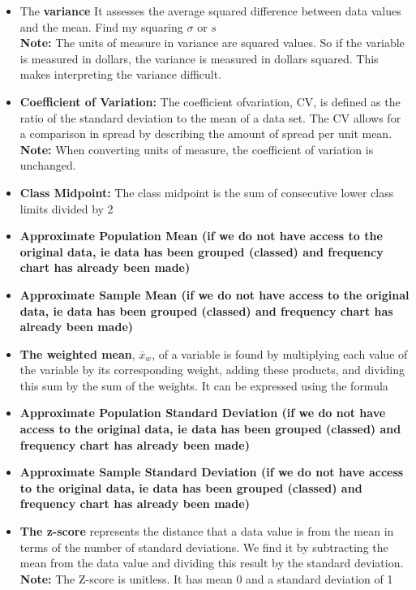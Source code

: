 \documentclass{report}
\begin{document}
\begin{itemize}
            \item The \textbf{variance}  It assesses the average squared difference between data values and the mean. Find my squaring $\sigma $ or $s$ \\
              \textbf{Note:} The units of measure in variance are squared values. So if the variable is measured in dollars, the variance is measured in dollars squared. This makes interpreting the variance difficult.
                \item \textbf{Coefficient of Variation:} The coefficient of​ variation, CV, is defined as the ratio of the standard deviation to the mean of a data set. The CV allows for a comparison in spread by describing the amount of spread per unit mean.
               \textbf{Note:} When converting units of​ measure, the coefficient of variation is unchanged.
             \item \textbf{Class Midpoint:} The class midpoint is the sum of consecutive lower class limits divided by 2
             \item \textbf{Approximate Population Mean (if we do not have access to the original data, ie data has been grouped (classed) and frequency chart has already been made)}
            \item \textbf{Approximate Sample Mean (if we do not have access to the original data, ie data has been grouped (classed) and frequency chart has already been made)}
            \item \textbf{The weighted mean}, $\overline{x}_{w}$, of a variable is found by multiplying each value of the variable by its corresponding weight, adding these products, and dividing this sum by the sum of the weights. It can be expressed using the formula
            \item \textbf{Approximate Population Standard Deviation (if we do not have access to the original data, ie data has been grouped (classed) and frequency chart has already been made)}
            \item \textbf{Approximate Sample Standard Deviation (if we do not have access to the original data, ie data has been grouped (classed) and frequency chart has already been made)}
             \item \textbf{The z-score} represents the distance that a data value is from the mean in terms of the number of standard deviations. We find it by subtracting the mean from the data value and dividing this result by the standard deviation.
                 \textbf{Note:} The Z-score is unitless. It has mean  0 and a standard deviation of 1 \\

\end{itemize}
\end{document}
